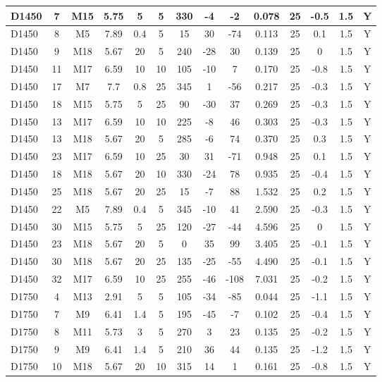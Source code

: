 \documentclass{article}
\begin{document}
\begin{center}
\begin{longtable}{|l|c|c|c|c|c|c|c|c|c|c|c|c|c|}
D1450	&	7	&	M15	&	5.75	&	5	&	5	&	330	&	-4	&	-2	&	0.078	&	25	&	-0.5	&	1.5	&	Y	\\\hline
D1450	&	8	&	M5	&	7.89	&	0.4	&	5	&	15	&	30	&	-74	&	0.113	&	25	&	0.1	&	1.5	&	Y	\\\hline
D1450	&	9	&	M18	&	5.67	&	20	&	5	&	240	&	-28	&	30	&	0.139	&	25	&	0	&	1.5	&	Y	\\\hline
D1450	&	11	&	M17	&	6.59	&	10	&	10	&	105	&	-10	&	7	&	0.170	&	25	&	-0.8	&	1.5	&	Y	\\\hline
D1450	&	17	&	M7	&	7.7	&	0.8	&	25	&	345	&	1	&	-56	&	0.217	&	25	&	-0.3	&	1.5	&	Y	\\\hline
D1450	&	18	&	M15	&	5.75	&	5	&	25	&	90	&	-30	&	37	&	0.269	&	25	&	-0.3	&	1.5	&	Y	\\\hline
D1450	&	13	&	M17	&	6.59	&	10	&	10	&	225	&	-8	&	46	&	0.303	&	25	&	-0.3	&	1.5	&	Y	\\\hline
D1450	&	13	&	M18	&	5.67	&	20	&	5	&	285	&	-6	&	74	&	0.370	&	25	&	0.3	&	1.5	&	Y	\\\hline
D1450	&	23	&	M17	&	6.59	&	10	&	25	&	30	&	31	&	-71	&	0.948	&	25	&	0.1	&	1.5	&	Y	\\\hline
D1450	&	18	&	M18	&	5.67	&	20	&	10	&	330	&	-24	&	78	&	0.935	&	25	&	-0.4	&	1.5	&	Y	\\\hline
D1450	&	25	&	M18	&	5.67	&	20	&	25	&	15	&	-7	&	88	&	1.532	&	25	&	0.2	&	1.5	&	Y	\\\hline
D1450	&	22	&	M5	&	7.89	&	0.4	&	5	&	345	&	-10	&	41	&	2.590	&	25	&	-0.3	&	1.5	&	Y	\\\hline
D1450	&	30	&	M15	&	5.75	&	5	&	25	&	120	&	-27	&	-44	&	4.596	&	25	&	0	&	1.5	&	Y	\\\hline
D1450	&	23	&	M18	&	5.67	&	20	&	5	&	0	&	35	&	99	&	3.405	&	25	&	-0.1	&	1.5	&	Y	\\\hline
D1450	&	30	&	M18	&	5.67	&	20	&	25	&	135	&	-25	&	-55	&	4.490	&	25	&	-0.1	&	1.5	&	Y	\\\hline
D1450	&	32	&	M17	&	6.59	&	10	&	25	&	255	&	-46	&	-108	&	7.031	&	25	&	-0.2	&	1.5	&	Y	\\\hline
D1750	&	4	&	M13	&	2.91	&	5	&	5	&	105	&	-34	&	-85	&	0.044	&	25	&	-1.1	&	1.5	&	Y	\\\hline
D1750	&	7	&	M9	&	6.41	&	1.4	&	5	&	195	&	-45	&	-7	&	0.102	&	25	&	-0.4	&	1.5	&	Y	\\\hline
D1750	&	8	&	M11	&	5.73	&	3	&	5	&	270	&	3	&	23	&	0.135	&	25	&	-0.2	&	1.5	&	Y	\\\hline
D1750	&	9	&	M9	&	6.41	&	1.4	&	5	&	210	&	36	&	44	&	0.135	&	25	&	-1.2	&	1.5	&	Y	\\\hline
D1750	&	10	&	M18	&	5.67	&	20	&	10	&	315	&	14	&	1	&	0.161	&	25	&	-0.8	&	1.5	&	Y	\\\hline

\end{longtable}
\end{center}
\end{document}
